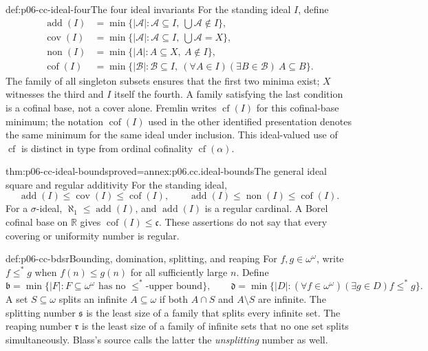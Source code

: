 \begin{hbdefinition}{def:p06-cc-ideal-four}{The four ideal invariants}
For the standing ideal \(I\), define
\[
\begin{aligned}
\operatorname{add}(I)&=\min\{|\mathcal A|:\mathcal A\subseteq I,
                       \ \bigcup\mathcal A\notin I\},\\
\operatorname{cov}(I)&=\min\{|\mathcal A|:\mathcal A\subseteq I,
                       \ \bigcup\mathcal A=X\},\\
\operatorname{non}(I)&=\min\{|A|:A\subseteq X,\ A\notin I\},\\
\operatorname{cof}(I)&=\min\{|\mathcal B|:\mathcal B\subseteq I,
                       \ (\forall A\in I)(\exists B\in\mathcal B)\ A\subseteq B\}.
\end{aligned}
\]
The family of all singleton subsets ensures that the first two minima exist; \(X\) witnesses
the third and \(I\) itself the fourth. A family satisfying the last
condition is a cofinal base, not a cover alone.
Fremlin writes \(\operatorname{cf}(I)\) for this cofinal-base minimum;
the notation \(\operatorname{cof}(I)\) used in the other identified
presentation denotes the same minimum for the same ideal under inclusion.
This ideal-valued use of \(\operatorname{cf}\) is distinct in type from
ordinal cofinality \(\operatorname{cf}(\alpha)\).
\end{hbdefinition}

\begin{hbtheorem}{thm:p06-cc-ideal-bounds}{proved=annex:p06.cc.ideal-bounds}{The general ideal square and regular additivity}
For the standing ideal,
\[
\operatorname{add}(I)\leq\operatorname{cov}(I)\leq\operatorname{cof}(I),
\qquad
\operatorname{add}(I)\leq\operatorname{non}(I)\leq\operatorname{cof}(I).
\]
For a \(\sigma\)-ideal, \(\aleph_1\leq\operatorname{add}(I)\), and
\(\operatorname{add}(I)\) is a regular cardinal. A Borel cofinal base on
\(\mathbb R\) gives \(\operatorname{cof}(I)\leq\mathfrak c\).
These assertions do not say that every covering or uniformity number is
regular.
\end{hbtheorem}

\begin{hbdefinition}{def:p06-cc-bdsr}{Bounding, domination, splitting, and reaping}
For \(f,g\in\omega^\omega\), write \(f\leq^*g\) when
\(f(n)\leq g(n)\) for all sufficiently large \(n\). Define
\[
\mathfrak b=\min\{|F|:F\subseteq\omega^\omega\text{ has no }\leq^*
  \text{-upper bound}\},\qquad
\mathfrak d=\min\{|D|:(\forall f\in\omega^\omega)(\exists g\in D)f\leq^*g\}.
\]
A set \(S\subseteq\omega\) splits an infinite \(A\subseteq\omega\)
if both \(A\cap S\) and \(A\setminus S\) are infinite.
The splitting number \(\mathfrak s\) is the least size of a family that
splits every infinite set. The reaping number \(\mathfrak r\) is the
least size of a family of infinite sets that no one set splits simultaneously.
Blass's source calls the latter the \emph{unsplitting} number as well.
\end{hbdefinition}

